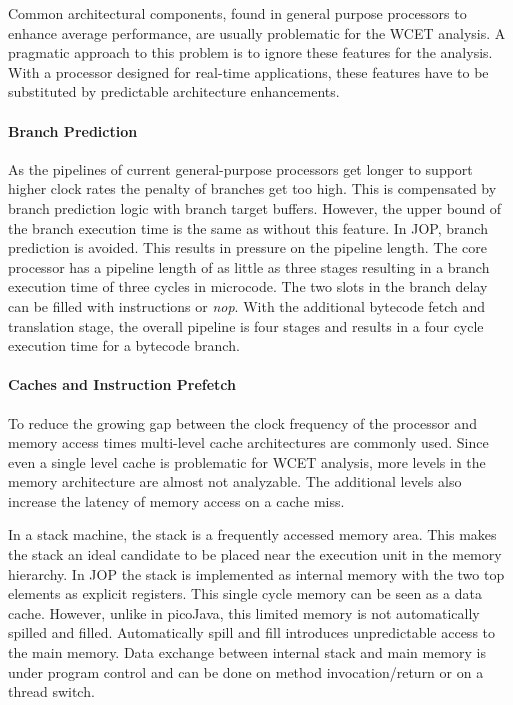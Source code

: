 Common architectural components, found in general purpose processors
to enhance average performance, are usually problematic for the WCET
analysis. A pragmatic approach to this problem is to ignore these
features for the analysis. With a processor designed for real-time
applications, these features have to be substituted by predictable
architecture enhancements.

\paragraph{Branch Prediction}

As the pipelines of current general-purpose processors get longer to
support higher clock rates the penalty of branches get too high.
This is compensated by branch prediction logic with branch target
buffers. However, the upper bound of the branch execution time is
the same as without this feature. In JOP, branch prediction is
avoided. This results in pressure on the pipeline length. The core
processor has a pipeline length of as little as three stages
resulting in a branch execution time of three cycles in microcode.
The two slots in the branch delay can be filled with instructions or
\emph{nop}. With the additional bytecode fetch and translation
stage, the overall pipeline is four stages and results in a four
cycle execution time for a bytecode branch.

\paragraph{Caches and Instruction Prefetch}

To reduce the growing gap between the clock frequency of the
processor and memory access times multi-level cache architectures
are commonly used. Since even a single level cache is problematic
for WCET analysis, more levels in the memory architecture are almost
not analyzable. The additional levels also increase the latency of
memory access on a cache miss.

In a stack machine, the stack is a frequently accessed memory area.
This makes the stack an ideal candidate to be placed near the
execution unit in the memory hierarchy. In JOP the stack is
implemented as internal memory with the two top elements as explicit
registers. This single cycle memory can be seen as a data cache.
However, unlike in picoJava, this limited memory is not
automatically spilled and filled. Automatically spill and fill
introduces unpredictable access to the main memory. Data exchange
between internal stack and main memory is under program control and
can be done on method invocation/return or on a thread switch.


